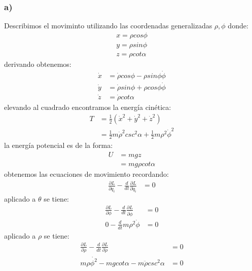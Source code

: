 \documentclass{article}
\begin{document}
\begin{tcolorbox}[breakable]
    \subsubsection*{a)}
    Describimos el moviminto utilizando las coordenadas generalizadas $\rho,\phi$ donde:
    \begin{align*}
        x = \rho cos\phi \\
        y = \rho sin\phi \\
        z = \rho cot\alpha
    \end{align*}
    derivando obtenemos:
    \begin{align*}
        \dot{x} &= \dot{\rho}cos\phi - \rho sin\phi \dot{\phi} \\
        \dot{y} &= \dot{\rho}sin\phi + \rho cos\phi \dot{\phi} \\
        \dot{z} &= \dot{\rho}cot\alpha
    \end{align*}
    elevando al cuadrado encontramos la energía cinética:
    \begin{align*}
        T 
        &= \frac{1}{2}(\dot{x}^2+\dot{y}^2+\dot{z}^2) \\
        &= \frac{1}{2}m\dot{\rho}^2csc^2\alpha + \frac{1}{2}m\rho^2\dot{\phi}^2
    \end{align*}
    la energía potencial es de la forma:
    \begin{align*} 
        U 
        &= mgz \\
        &= mg\rho cot\alpha
    \end{align*}
    obtenemos las ecuaciones de movimiento recordando:
    \begin{align*}
        \frac{\partial L}{\partial q_i} - \frac{d}{dt}\frac{\partial L }{\partial \dot{q}_i} &= 0 
    \end{align*}
    aplicado a $\theta$ se tiene:
    \begin{align*}
        \frac{\partial L}{\partial \phi} - \frac{d}{dt}\frac{\partial L}{\partial \dot{\phi}} &= 0 \\ 
        0 - \frac{d}{dt}m\rho^2\dot{\phi} &= 0
    \end{align*}
    aplicado a $\rho$ se tiene:
    \begin{align*}
        \frac{\partial L}{\partial \rho} - \frac{d}{dt}\frac{\partial L}{\partial \dot{\rho}} &= 0 \\ 
        m\rho\dot{\phi^2} - mgcot\alpha - m\ddot{\rho}csc^2\alpha &= 0 \\ 
    \end{align*}

\end{tcolorbox}
\end{document}
